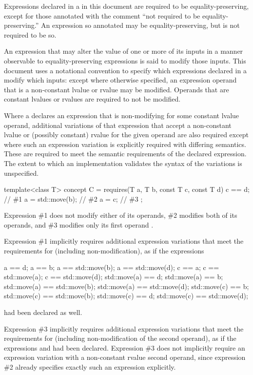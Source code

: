 \pnum
Expressions declared in a  in this document are
required to be equality-preserving, except for those annotated with the comment
``not required to be equality-preserving.'' An expression so annotated
may be equality-preserving, but is not required to be so.

\pnum
An expression that may alter the value of one or more of its inputs in a manner
observable to equality-preserving expressions is said to modify those inputs.
This document uses a notational convention to specify which expressions declared
in a  modify which inputs: except where
otherwise specified, an expression operand that is a non-constant lvalue or
rvalue may be modified. Operands that are constant lvalues or rvalues are
required to not be modified.

\pnum
Where a  declares an expression that is
non-modifying for some constant lvalue operand, additional variations of that
expression that accept a non-constant lvalue or (possibly constant) rvalue for
the given operand are also required except where such an expression variation is
explicitly required with differing semantics. These
 are required to meet the semantic
requirements of the declared expression. The extent to which an implementation
validates the syntax of the variations is unspecified.

\begin{example}
\begin{codeblock}
template<class T> concept C = requires(T a, T b, const T c, const T d) {
  c == d;           // \#1
  a = std::move(b); // \#2
  a = c;            // \#3
};
\end{codeblock}

Expression \#1 does not modify either of its operands, \#2 modifies both of its
operands, and \#3 modifies only its first operand .

Expression \#1 implicitly requires additional expression variations that meet
the requirements for  (including non-modification), as if the
expressions
\begin{codeblock}
a == d;                       a == b;                       a == std::move(b); a == std::move(d);
c == a;                       c == std::move(a);            c == std::move(d);
std::move(a) == d;            std::move(a) == b;
std::move(a) == std::move(b); std::move(a) == std::move(d);
std::move(c) == b;            std::move(c) == std::move(b);
std::move(c) == d;            std::move(c) == std::move(d);
\end{codeblock}
had been declared as well.

Expression \#3 implicitly requires additional expression variations that meet
the requirements for  (including non-modification of the second
operand), as if the expressions  and  had
been declared. Expression \#3 does not implicitly require an expression
variation with a non-constant rvalue second operand, since expression \#2
already specifies exactly such an expression explicitly.
\end{example}

